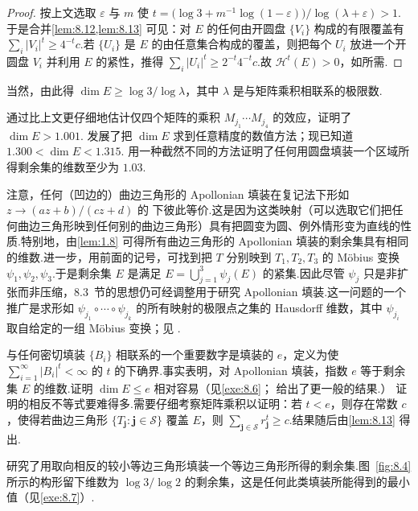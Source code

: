 \begin{proof}
按上文选取 $\varepsilon$ 与 $m$ 使 $t=\bigl(\log 3+m^{-1}\log(1-\varepsilon)\bigr)/\log(\lambda+\varepsilon)>1$.于是合并\cref{lem:8.12,lem:8.13} 可见：对 $E$ 的任何由开圆盘 $\{V_i\}$ 构成的有限覆盖有 $\sum_{i}|V_i|^{t}\geq 4^{-t}c$.若 $\{U_i\}$ 是 $E$ 的由任意集合构成的覆盖，则把每个 $U_i$ 放进一个开圆盘 $V_i$ 并利用 $E$ 的紧性，推得 $\sum_{i}|U_i|^{t}\geq 2^{-t}4^{-t}c$.故 $\mathcal{H}^t(E)>0$，如所需.
\end{proof}

当然，由此得 $\dim E\geq\log 3/\log\lambda$，其中 $\lambda$ 是与矩阵乘积相联系的极限数.

\textcite{hirst1967} 通过比上文更仔细地估计仅四个矩阵的乘积 $M_{j_1}\cdots M_{j_4}$ 的效应，证明了 $\dim E>1.001$.\textcite{boyd1973a} 发展了把 $\dim E$ 求到任意精度的数值方法；现已知道 $1.300<\dim E<1.315$.\textcite{larman1967b} 用一种截然不同的方法证明了任何用圆盘填装一个区域所得剩余集的维数至少为 $1.03$.

注意，任何（凹边的）曲边三角形的 Apollonian 填装在复记法下形如 $z\to(az+b)/(cz+d)$ 的 下彼此等价.这是因为这类映射（可以选取它们把任何曲边三角形映到任何别的曲边三角形）具有把圆变为圆、例外情形变为直线的性质.特别地，由\cref{lem:1.8} 可得所有曲边三角形的 Apollonian 填装的剩余集具有相同的维数.进一步，用前面的记号，可找到把 $T$ 分别映到 $T_1,T_2,T_3$ 的 Möbius 变换 $\psi_1,\psi_2,\psi_3$.于是剩余集 $E$ 是满足 $E=\bigcup_{j=1}^{3}\psi_j(E)$ 的紧集.因此尽管 $\psi_j$ 只是非扩张而非压缩，8.3~节的思想仍可经调整用于研究 Apollonian 填装.这一问题的一个推广是求形如 $\psi_{j_1}\circ\cdots\circ\psi_{j_k}$ 的所有映射的极限点之集的 Hausdorff 维数，其中 $\psi_{j_i}$ 取自给定的一组 Möbius 变换；见 \textcites{patterson1976,sullivan1979,mandelbrot1983}.

与任何密切填装 $\{B_i\}$ 相联系的一个重要数字是填装的 $e$，定义为使 $\sum_{i=1}^{\infty}|B_i|^t<\infty$ 的 $t$ 的下确界.事实表明，对 Apollonian 填装，指数 $e$ 等于剩余集 $E$ 的维数.证明 $\dim E\leq e$ 相对容易（见\cref{exe:8.6}；\textcite{larman1966} 给出了更一般的结果.）\textcite{boyd1973b} 证明的相反不等式要难得多.需要仔细考察矩阵乘积以证明：若 $t<e$，则存在常数 $c$，使得若曲边三角形 $\{T_{\mathbf{j}}:\mathbf{j}\in\mathcal{S}\}$ 覆盖 $E$，则 $\sum_{\mathbf{j}\in\mathcal{S}}r_{\mathbf{j}}^t\geq c$.结果随后由\cref{lem:8.13} 得出.

\textcite{eggleston1953a} 研究了用取向相反的较小等边三角形填装一个等边三角形所得的剩余集.图~\ref{fig:8.4} 所示的构形留下维数为 $\log 3/\log 2$ 的剩余集，这是任何此类填装所能得到的最小值（见\cref{exe:8.7}）.

